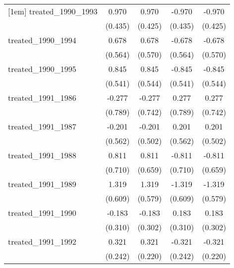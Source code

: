 {\begin{tabular}{l*{4}{c}}
[1em]
treated\_1990\_1993&       0.970\sym{*}  &       0.970\sym{*}  &      -0.970\sym{*}  &      -0.970\sym{*}  \\
            &     (0.435)         &     (0.425)         &     (0.435)         &     (0.425)         \\
[1em]
treated\_1990\_1994&       0.678         &       0.678         &      -0.678         &      -0.678         \\
            &     (0.564)         &     (0.570)         &     (0.564)         &     (0.570)         \\
[1em]
treated\_1990\_1995&       0.845         &       0.845         &      -0.845         &      -0.845         \\
            &     (0.541)         &     (0.544)         &     (0.541)         &     (0.544)         \\
[1em]
treated\_1991\_1986&      -0.277         &      -0.277         &       0.277         &       0.277         \\
            &     (0.789)         &     (0.742)         &     (0.789)         &     (0.742)         \\
[1em]
treated\_1991\_1987&      -0.201         &      -0.201         &       0.201         &       0.201         \\
            &     (0.562)         &     (0.502)         &     (0.562)         &     (0.502)         \\
[1em]
treated\_1991\_1988&       0.811         &       0.811         &      -0.811         &      -0.811         \\
            &     (0.710)         &     (0.659)         &     (0.710)         &     (0.659)         \\
[1em]
treated\_1991\_1989&       1.319\sym{*}  &       1.319\sym{*}  &      -1.319\sym{*}  &      -1.319\sym{*}  \\
            &     (0.609)         &     (0.579)         &     (0.609)         &     (0.579)         \\
[1em]
treated\_1991\_1990&      -0.183         &      -0.183         &       0.183         &       0.183         \\
            &     (0.310)         &     (0.302)         &     (0.310)         &     (0.302)         \\
[1em]
treated\_1991\_1992&       0.321         &       0.321         &      -0.321         &      -0.321         \\
            &     (0.242)         &     (0.220)         &     (0.242)         &     (0.220)         \\

\end{tabular}}
